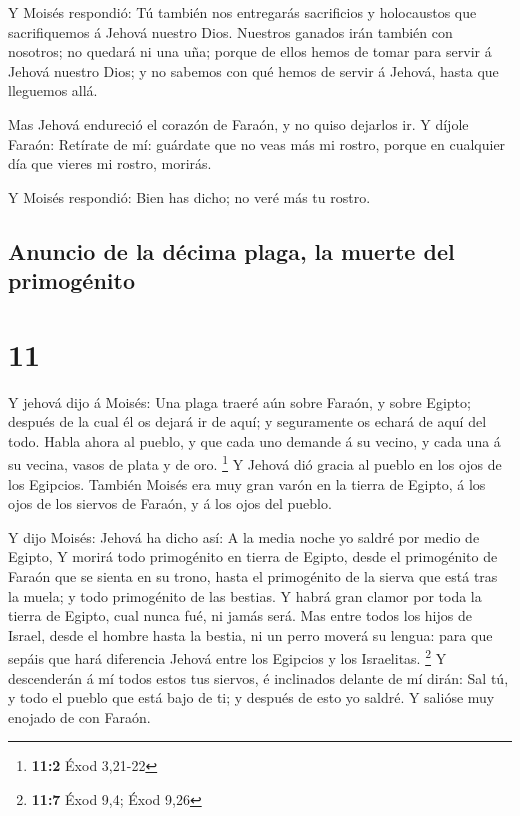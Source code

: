  Y Moisés respondió: Tú también nos entregarás sacrificios
y holocaustos que sacrifiquemos á Jehová nuestro Dios. 
Nuestros ganados irán también con nosotros; no quedará ni una uña;
porque de ellos hemos de tomar para servir á Jehová nuestro Dios; y no
sabemos con qué hemos de servir á Jehová, hasta que lleguemos allá.

 Mas Jehová endureció el corazón de Faraón, y no quiso
dejarlos ir.  Y díjole Faraón: Retírate de mí: guárdate que
no veas más mi rostro, porque en cualquier día que vieres mi rostro,
morirás.

 Y Moisés respondió: Bien has dicho; no veré más tu rostro.

\hypertarget{anuncio-de-la-duxe9cima-plaga-la-muerte-del-primoguxe9nito}{%
\subsection{Anuncio de la décima plaga, la muerte del
primogénito}\label{anuncio-de-la-duxe9cima-plaga-la-muerte-del-primoguxe9nito}}

\hypertarget{section-10}{%
\section{11}\label{section-10}}

 Y jehová dijo á Moisés: Una plaga traeré aún sobre Faraón,
y sobre Egipto; después de la cual él os dejará ir de aquí; y
seguramente os echará de aquí del todo.  Habla ahora al
pueblo, y que cada uno demande á su vecino, y cada una á su vecina,
vasos de plata y de oro. \footnote{\textbf{11:2} Éxod 3,21-22}
 Y Jehová dió gracia al pueblo en los ojos de los Egipcios.
También Moisés era muy gran varón en la tierra de Egipto, á los ojos de
los siervos de Faraón, y á los ojos del pueblo.

 Y dijo Moisés: Jehová ha dicho así: A la media noche yo
saldré por medio de Egipto,  Y morirá todo primogénito en
tierra de Egipto, desde el primogénito de Faraón que se sienta en su
trono, hasta el primogénito de la sierva que está tras la muela; y todo
primogénito de las bestias.  Y habrá gran clamor por toda la
tierra de Egipto, cual nunca fué, ni jamás será.  Mas entre
todos los hijos de Israel, desde el hombre hasta la bestia, ni un perro
moverá su lengua: para que sepáis que hará diferencia Jehová entre los
Egipcios y los Israelitas. \footnote{\textbf{11:7} Éxod 9,4; Éxod 9,26}
 Y descenderán á mí todos estos tus siervos, é inclinados
delante de mí dirán: Sal tú, y todo el pueblo que está bajo de ti; y
después de esto yo saldré. Y salióse muy enojado de con Faraón.

